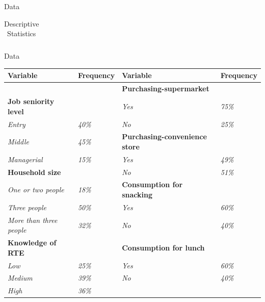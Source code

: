 \documentclass[12pt]{beamer}
\begin{document}
\begin{frame}{Data}
\begin{table}[H]
\begin{tabular}{l|l|l|l}
		\end{tabular}
		\caption{Descriptive Statistics}
		\label{table:statistics}
	\end{table}
\end{frame}

\begin{frame}{Data}
	\scriptsize
	\begin{table}[H]
		\begin{tabular}{l|l|l|l}
			\hline
			\textbf{Variable}                 & \textbf{Frequency} & \textbf{Variable}                              & \textbf{Frequency} \\ \hline
			 & & \textbf{Purchasing-supermarket}       & \textit{}          \\ \hline
			\textbf{Job seniority level}      & \textit{}          & \textit{Yes}                                   & \textit{75\%}      \\ \hline
			\textit{Entry}                    & \textit{40\%}      & \textit{No}                                    & \textit{25\%}      \\ \hline
			\textit{Middle}                   & \textit{45\%}      & \textbf{Purchasing-convenience store} & \textit{}          \\ \hline
			\textit{Managerial}               & \textit{15\%}      & \textit{Yes}                                   & \textit{49\%}      \\ \hline
			\textbf{Household size}           & \textit{}          & \textit{No}                                    & \textit{51\%}      \\ \hline
			\textit{One or two people}        & \textit{18\%}      & \textbf{Consumption for snacking}              & \textit{}          \\ \hline
			\textit{Three people}             & \textit{50\%}      & \textit{Yes}                                   & \textit{60\%}      \\ \hline
			\textit{More than three people}   & \textit{32\%}      & \textit{No}                                    & \textit{40\%}      \\ \hline
			\textbf{Knowledge of RTE}         & \textit{}          & \textbf{Consumption for lunch}                 & \textit{}          \\ \hline
			\textit{Low}                      & \textit{25\%}      & \textit{Yes}                                   & \textit{60\%}      \\ \hline
			\textit{Medium}                   & \textit{39\%}      & \textit{No}                                    & \textit{40\%}      \\ \hline
			\textit{High}                     & \textit{36\%}      &                                                & \textit{}          \\ \hline
			

\end{tabular}
\end{table}
\end{frame}
\end{document}
